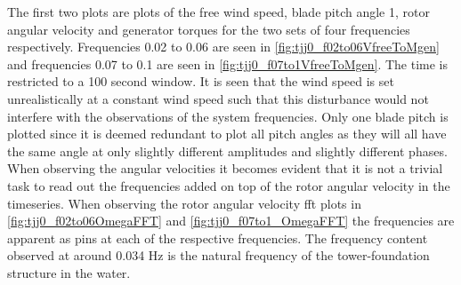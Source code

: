 The first two plots are plots of the free wind speed, blade pitch angle 1, rotor angular velocity and generator torques for the two sets of four frequencies respectively. Frequencies 0.02 to 0.06 are seen in \cref{fig:tjj0_f02to06VfreeToMgen} and frequencies 0.07 to 0.1 are seen in \cref{fig:tjj0_f07to1VfreeToMgen}. The time is restricted to a 100 second window. It is seen that the wind speed is set unrealistically at a constant wind speed such that this disturbance would not interfere with the observations of the system frequencies. Only one blade pitch is plotted since it is deemed redundant to plot all pitch angles as they will all have the same angle at only slightly different amplitudes and slightly different phases. When observing the angular velocities it becomes evident that it is not a trivial task to read out the frequencies added on top of the rotor angular velocity in the timeseries. When observing the rotor angular velocity fft plots in \cref{fig:tjj0_f02to06OmegaFFT} and \cref{fig:tjj0_f07to1_OmegaFFT} the frequencies are apparent as pins at each of the respective frequencies. The frequency content observed at around 0.034 Hz is the natural frequency of the tower-foundation structure in the water.

